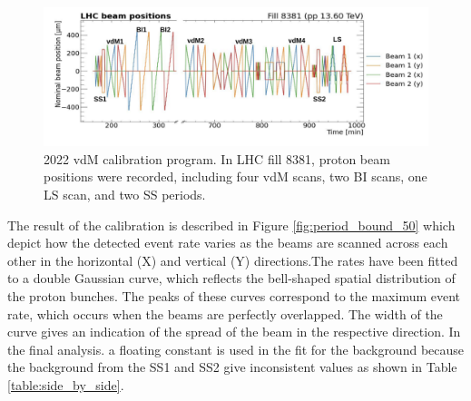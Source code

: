 \begin{figure}[!htp]
\centering
\includegraphics[width=1\textwidth]{ashish_thesis/2022_vdM.png}
\caption[2022 vdM Program]{%
  2022 vdM calibration program. In LHC fill 8381, proton beam positions were recorded, including four vdM scans, two BI scans, one LS scan, and two SS periods.
}
\label{fig:2022_vdM_program}
\end{figure}


The result of the calibration is described in
Figure \ref{fig:period_bound_50} which depict how the detected event rate varies as the beams are scanned across each other in the horizontal (X) and vertical (Y) directions.The rates have been fitted to a double Gaussian curve, which reflects the bell-shaped spatial distribution of the proton bunches. The peaks of these curves correspond to the maximum event rate, which occurs when the beams are perfectly overlapped. The width of the curve gives an indication of the spread of the beam in the respective direction. In the final analysis. a floating constant is used in the fit for the background because the background from the SS1 and SS2 give inconsistent values as shown in Table \ref{table:side_by_side}.

